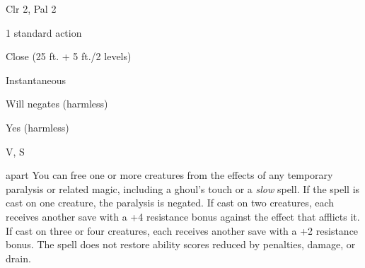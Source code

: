 
\begin{description*}
\item[Level:] Clr 2, Pal 2
\item[Casting Time:] 1 standard action
\item[Range:] Close (25 ft. + 5 ft./2 levels)
\item[Duration:] Instantaneous
\item[Saving Throw:] Will negates (harmless)
\item[Spell Resistance:] Yes (harmless)
\item[Components:] V, S
\end{description*}

apart
You can free one or more creatures from the effects of any temporary paralysis
or related magic, including a ghoul's touch or a \textit{slow} spell. If the spell
is cast on one creature, the paralysis is negated. If cast on two creatures, each
receives another save with a +4 resistance bonus against the effect that afflicts
it. If cast on three or four creatures, each receives another save with a +2 resistance
bonus.
The spell does not restore ability scores reduced by penalties, damage, or drain.